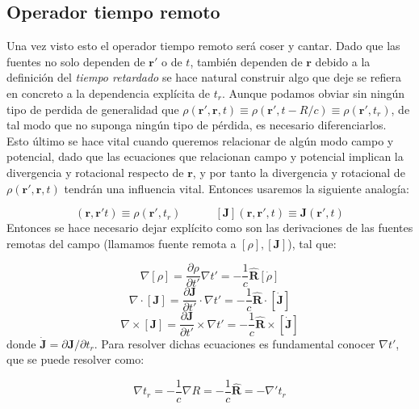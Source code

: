 \documentclass[12pt,a4paper]{article}
\newcommand{\parciales}[2]{\frac{\partial #1}{\partial #2}}
\newcommand{\tquad}{\quad \quad \quad}
\newcommand{\rota}{\nabla \times}
\newcommand{\dive}{\nabla \cdot}
\newcommand{\Jn}{\mathbf{J}}
\newcommand{\rn}{\mathbf{r}}
\newcommand{\hnR}{\hat{\mathbf{R}}}
\numberwithin{equation}{section}
\numberwithin{figure}{section}
\begin{document}
\subsection{Operador tiempo remoto}

Una vez visto esto el operador tiempo remoto será coser y cantar. Dado que las fuentes no solo dependen de $\rn'$ o de $t$, también dependen de $\rn$ debido a la definición del \textit{tiempo retardado} se hace natural construir algo que deje se refiera en concreto a la dependencia explícita de $t_r$. Aunque podamos obviar sin ningún tipo de perdida de generalidad que $\rho(\rn',\rn,t) \equiv \rho ( \rn', t - R/c)\equiv \rho (\rn',t_r)$, de tal modo que no suponga ningún tipo de pérdida, es necesario diferenciarlos. \\

Esto último se hace vital cuando queremos relacionar de algún modo campo y potencial, dado que las ecuaciones que relacionan campo y potencial implican la divergencia y rotacional respecto de $\rn$, y por tanto la divergencia y rotacional de $\rho (\rn',\rn,t)$ tendrán una influencia vital. Entonces usaremos la siguiente analogía:

\begin{equation}
[\rho] (\rn,\rn't) \equiv \rho (\rn',t_r) \tquad [\Jn] (\rn,\rn',t) \equiv \Jn (\rn',t)
\end{equation}
Entonces se hace necesario dejar explícito como son las derivaciones de las fuentes remotas del campo (llamamos fuente remota a $[\rho],[\Jn]$), tal que:

\begin{equation}
\nabla [\rho] = \parciales{\rho}{t'} \nabla t' = - \dfrac{1}{c} \hnR [\dot{\rho}] 
\end{equation}
\begin{equation}
\dive [\Jn] = \parciales{\Jn}{t'} \cdot \nabla t' = - \dfrac{1}{c} \hnR \cdot [\dot{\Jn}] 
\end{equation}
\begin{equation}
\rota [\Jn] = \parciales{\Jn}{t'} \times  \nabla t' = - \dfrac{1}{c} \hnR \times [\dot{\Jn}] 
\end{equation}
donde $\dot{\Jn} = \partial \Jn / \partial t_r $. Para resolver dichas ecuaciones es fundamental conocer $\nabla t'$, que se puede resolver como:

\begin{equation}
\nabla t_r = - \frac{1}{c} \nabla R = - \dfrac{1}{c} \hnR = - \nabla' t_r
\end{equation}
\end{document}
